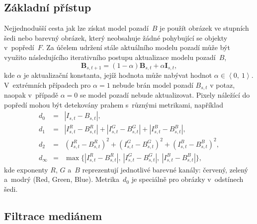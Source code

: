 \newpage




\subsection{Základní přístup}
\label{sec:BS_teorie_zakladni_pristup}

\label{sec:BS_zakladni}
\par{Nejjednodušší cesta jak lze získat model pozadí~$B$ je použít obrázek ve stupních šedi nebo barevný obrázek, který neobsahuje žádné pohybující se objekty v~popředí~$F$. Za účelem udržení stále aktuálního modelu pozadí může být využito následujícího iterativního postupu aktualizace modelu pozadí~$B$,
\begin{equation}
	\bm{B}_{s,t+1} = (1 - \alpha)\bm{B}_{s,t} + \alpha \bm{I}_{s,t},
\end{equation}
kde $\alpha$ je aktualizační konstanta, jejíž hodnota může nabývat hodnot $\alpha \in \left< 0,~1 \right>$. V~extrémních případech pro $\alpha = 1$ nebude brán model pozadí $B_{s,t}$ v potaz, naopak v~případě $\alpha = 0$ se model pozadí nebude aktualizovat. Pixely náležící do popředí mohou být detekovány prahem s~různými metrikami, například
\begin{eqnarray}
	d_0 &= &|I_{s,t} - B_{s,t}|,\\
	d_1 &= &|I_{s,t}^R - B_{s,t}^R| + |I_{s,t}^G - B_{s,t}^G| + | I_{s,t}^B - B_{s,t}^B|,\\
	d_2 &= &(I_{s,t}^R - B_{s,t}^R)^2 + (I_{s,t}^G - B_{s,t}^G)^2 + (I_{s,t}^B - B_{s,t}^B)^2 ,\\
	d_{\infty} &= &\max \{ |I_{s,t}^R - B_{s,t}^R|,~ |I_{s,t}^G - B_{s,t}^G|,~ | I_{s,t}^B - B_{s,t}^B| \},
\end{eqnarray}
kde exponenty $R$, $G$ a~$B$ reprezentují jednotlivé barevné kanály: červený, zelený a~modrý (Red, Green, Blue). Metrika~$d_0$ je speciálně pro obrázky v~odstínech šedi.}














\subsection{Filtrace mediánem}
\label{sec:BS_teorie_filtrace_medianem}

